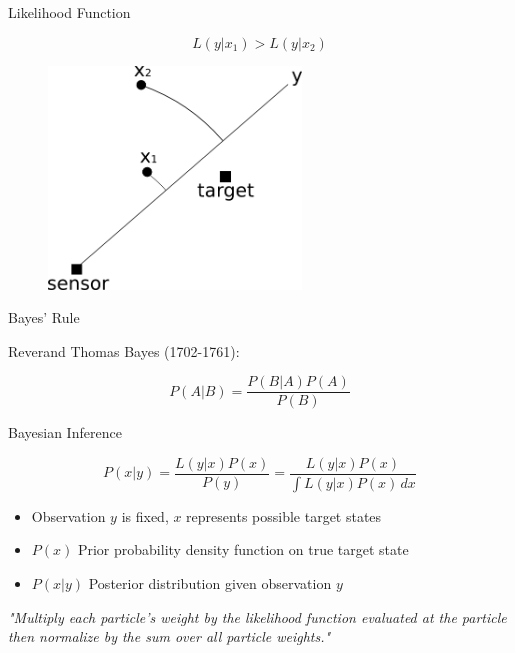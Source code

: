 \documentclass{beamer}
\begin{document}

\begin{frame}{Likelihood Function}

\[
L(y|x_{1})>L(y|x_{2})
\]

\begin{figure}
\centering
\includegraphics[width=0.6\textwidth]{data/likelihood_function_diagram.png}
\end{figure}

\end{frame}


\begin{frame}{Bayes' Rule}

Reverand Thomas Bayes (1702-1761):

\vspace{1cm}

\begin{equation}
P(A|B)=\frac{P(B|A)P(A)}{P(B)}
\end{equation}

\end{frame}


\begin{frame}{Bayesian Inference}

\begin{equation}
P(x|y) = \frac{L(y|x)P(x)}{P(y)} = \frac{L(y|x)P(x)}{\int \! L(y|x)P(x) \, dx}
\end{equation}

\vspace{1cm}

\begin{itemize}
\item Observation \(y\) is fixed, \(x\) represents possible target states
\item \(P(x)\) Prior probability density function on true target state
\item \(P(x|y)\) Posterior distribution given observation \(y\)
\end{itemize}

\vspace{1cm}

\emph{"Multiply each particle's weight by the likelihood function evaluated at the particle then normalize by the sum over all particle weights."}

\end{frame}
\end{document}
